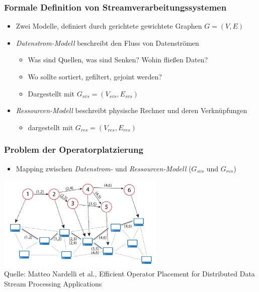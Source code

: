 \documentclass{beamer}
\begin{document}
\begin{frame}
\frametitle{Formale Definition von Streamverarbeitungssystemen}
\begin{itemize}
    \item Zwei Modelle, definiert durch gerichtete gewichtete Graphen $G= (V,E)$
    \item \textit{Datenstrom-Modell} beschreibt den Fluss von Datenströmen
    \begin{itemize}
        \item Was sind Quellen, was sind Senken? Wohin fließen Daten?
        \item Wo sollte sortiert, gefiltert, gejoint werden?
        \item Dargestellt mit $G_{svs} = (V_{svs}, E_{svs})$
    \end{itemize}
    \item \textit{Ressourcen-Modell} beschreibt physische Rechner und deren Verknüpfungen
    \begin{itemize}
        \item dargestellt mit $G_{res} = (V_{res}, E_{res})$
    \end{itemize}
\end{itemize}
\end{frame}

\begin{frame}
\frametitle{Problem der Operatorplatzierung}
\begin{itemize}
    \item Mapping zwischen \textit{Datenstrom- } und \textit{Ressourcen-Modell} ($G_{svs}$ und $G_{res}$)
\end{itemize}
\begin{center}
    \includegraphics[width=0.6\textwidth]{res/OPP-graph.png} \\
    \tiny \color{gray} Quelle: Matteo Nardelli et al., Efficient Operator Placement for Distributed Data Stream Processing Applications
\end{center}
\end{frame}
\end{document}
